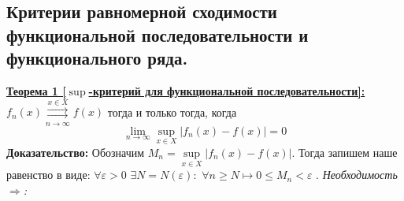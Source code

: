 \documentclass[a4paper,12pt]{article} %
\renewcommand {\geq}{\geqslant}
\renewcommand {\leq}{\leqslant}
\begin{document}
\subsection{Критерии равномерной сходимости функциональной последовательности и функционального ряда.}
\underline{\textbf{Теорема 1 [$\sup$-критерий для функциональной последовательности]:}}\newline 
$f_n(x) \overset{x \in X}{\underset{n \rightarrow \infty}{\rightrightarrows}} f(x)$ тогда и только тогда, когда $$\lim\limits_{n \rightarrow \infty} \sup_{x \in X}|f_n(x)-f(x)| = 0$$
\textbf{Доказательство:} 
\newline
Обозначим $M_n = \sup\limits_{x \in X}{|f_n(x)-f(x)|}$. \newline
Тогда запишем  наше равенство в виде: \newline
\hspace*{40mm}$\forall \varepsilon > 0$ $\exists N = N(\varepsilon):$ $\forall n \geq N \mapsto 0 \leq M_n < \varepsilon$ . \textit{Необходимость $\Rightarrow$:} \newline
\end{document}
